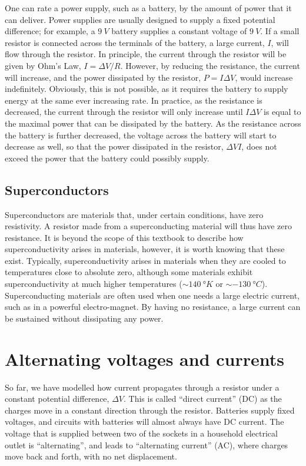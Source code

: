 One can rate a power supply, such as a battery, by the amount of power that it can deliver. Power supplies are usually designed to supply a fixed potential difference; for example, a $\SI{9}{V}$ battery supplies a constant voltage of $\SI{9}{V}$. If a small resistor is connected across the terminals of the battery, a large current, $I$, will flow through the resistor. In principle, the current through the resistor will be given by Ohm's Law, $I=\Delta V/R$. However, by reducing the resistance, the current will increase, and the power dissipated by the resistor, $P=I\Delta V $, would increase indefinitely. Obviously, this is not possible, as it requires the battery to supply energy at the same ever increasing rate. In practice, as the resistance is decreased, the current through the resistor will only increase until $I \Delta V$ is equal to the maximal power that can be dissipated by the battery. As the resistance across the battery is further decreased, the voltage across the battery will start to decrease as well, so that the power dissipated in the resistor, $\Delta V I$, does not exceed the power that the battery could possibly supply.

\subsection{Superconductors}
Superconductors are materials that, under certain conditions, have zero resistivity. A resistor made from a superconducting material will thus have zero resistance. It is beyond the scope of this textbook to describe how superconductivity arises in materials, however, it is worth knowing that these exist. Typically, superconductivity arises in materials when they are cooled to temperatures close to absolute zero, although some materials exhibit superconductivity at much higher temperatures ($\sim\SI{140}{\degree K}$ or $\sim\SI{-130}{\degree C}$). Superconducting materials are often used when one needs a large electric current, such as in a powerful electro-magnet. By having no resistance, a large current can be sustained without dissipating any power. 

                                                         
\section{Alternating voltages and currents}
So far, we have modelled how current propagates through a resistor under a constant potential difference, $\Delta V$. This is called ``direct current'' (DC) as the charges move in a constant direction through the resistor. Batteries supply fixed voltages, and circuits with batteries will almost always have DC current. The voltage that is supplied between two of the sockets in a household electrical outlet is ``alternating'', and leads to ``alternating current'' (AC), where charges move back and forth, with no net displacement. 

